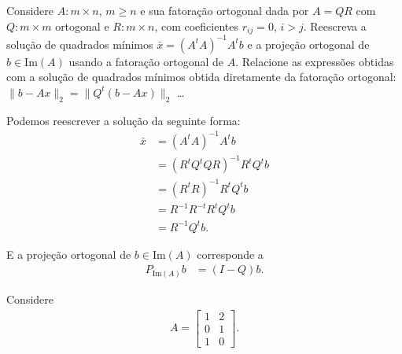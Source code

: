 \begin{questions}
    \question Considere $A : m \times n$, $m \geq n$ e sua fatora\c{c}\~{a}o ortogonal dada por $A = Q R$ com $Q : m \times m$ ortogonal e $R : m \times n$, com coeficientes $r_{ij} = 0$, $i > j$. Reescreva a solu\c{c}\~{a}o de quadrados m\'{i}nimos $\bar{x} = \left( A^t A \right)^{-1} A^t b$ e a proje\c{c}\~{a}o ortogonal de $b \in \text{Im}(A)$ usando a fatora\c{c}\~{a}o ortogonal de $A$. Relacione as express\~{o}es obtidas com a solu\c{c}\~{a}o de quadrados m\'{i}nimos obtida diretamente da fatora\c{c}\~{a}o ortogonal: $\| b - A x \|_2 = \| Q^t \left( b - A x \right) \|_2$ \ldots
    \begin{solution}
        Podemos reescrever a solu\c{c}\~{a}o da seguinte forma:
        \begin{align*}
            \bar{x} &= \left( A^t A \right)^{-1} A^t b \\
            &= \left( R^t Q^t Q R \right)^{-1} R^t Q^t b \\
            &= \left( R^t R \right)^{-1} R^t Q^t b \\
            &= R^{-1} R^{-t} R^t Q^t b \\
            &= R^{-1} Q^t b.
        \end{align*}

        E a proje\c{c}\~{a}o ortogonal de $b \in \text{Im}(A)$ corresponde a
        \begin{align*}
            P_{\text{Im}(A)} b &= (I - Q) b.
        \end{align*}
    \end{solution}

    \question Considere
    \begin{align*}
        A = \begin{bmatrix}
            1 & 2 \\
            0 & 1 \\
            1 & 0
        \end{bmatrix}.
    \end{align*}
    \begin{parts}

\end{parts}
\end{questions}
